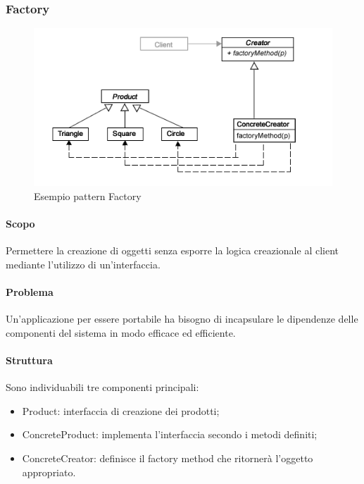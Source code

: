 \documentclass[../PianoDiQualifica.tex]{subfiles}
\begin{document}
			\subsubsection{Factory}
				\begin{figure}[H] \label{fig:Factory}
					\centering
					\includegraphics[scale=0.8]{Immagini/FactoryEx.png}
					\caption{Esempio pattern Factory}
				\end{figure}
				\paragraph{Scopo\\}
					Permettere la creazione di oggetti senza esporre la logica creazionale al client
					mediante l'utilizzo di un'interfaccia.
				\paragraph{Problema\\}
					Un'applicazione per essere portabile ha bisogno di incapsulare le dipendenze
					delle componenti del sistema in modo efficace ed efficiente.
				\paragraph{Struttura\\}
					Sono individuabili tre componenti principali:
					\begin{itemize}
						\item Product: interfaccia di creazione dei prodotti;
						\item ConcreteProduct: implementa l'interfaccia secondo i metodi
						definiti;
						\item ConcreteCreator: definisce il factory method che ritornerà l'oggetto
						appropriato.
					\end{itemize}
\end{document}
